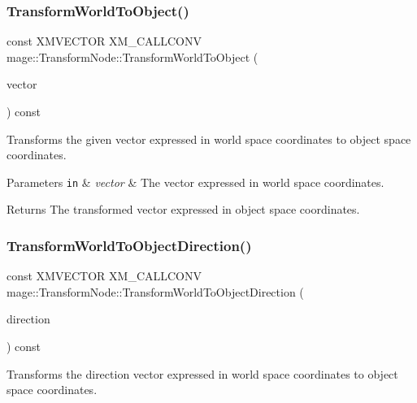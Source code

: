 \subsubsection{\texorpdfstring{Transform\+World\+To\+Object()}{TransformWorldToObject()}}
{\footnotesize\ttfamily const X\+M\+V\+E\+C\+T\+OR X\+M\+\_\+\+C\+A\+L\+L\+C\+O\+NV mage\+::\+Transform\+Node\+::\+Transform\+World\+To\+Object (\begin{DoxyParamCaption}\item[{F\+X\+M\+V\+E\+C\+T\+OR}]{vector }\end{DoxyParamCaption}) const\hspace{0.3cm}{\ttfamily [noexcept]}}

Transforms the given vector expressed in world space coordinates to object space coordinates.


\begin{DoxyParams}[1]{Parameters}
\mbox{\tt in}  & {\em vector} & The vector expressed in world space coordinates. \\
\hline
\end{DoxyParams}
\begin{DoxyReturn}{Returns}
The transformed vector expressed in object space coordinates. 
\end{DoxyReturn}
\hypertarget{structmage_1_1_transform_node_aac30202006ee4ccc2b9e05adb145656b}{}\label{structmage_1_1_transform_node_aac30202006ee4ccc2b9e05adb145656b} 
\subsubsection{\texorpdfstring{Transform\+World\+To\+Object\+Direction()}{TransformWorldToObjectDirection()}}
{\footnotesize\ttfamily const X\+M\+V\+E\+C\+T\+OR X\+M\+\_\+\+C\+A\+L\+L\+C\+O\+NV mage\+::\+Transform\+Node\+::\+Transform\+World\+To\+Object\+Direction (\begin{DoxyParamCaption}\item[{F\+X\+M\+V\+E\+C\+T\+OR}]{direction }\end{DoxyParamCaption}) const\hspace{0.3cm}{\ttfamily [noexcept]}}

Transforms the direction vector expressed in world space coordinates to object space coordinates.


